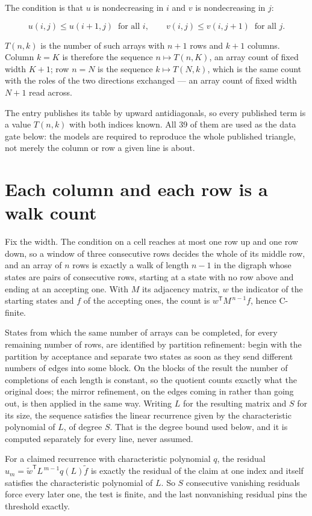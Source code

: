 \documentclass[11pt]{article}
\theoremstyle{definition}
\begin{document}
The condition is that $u$ is nondecreasing in $i$ and $v$ is nondecreasing in $j$:

\[u(i,j) \le u(i{+}1,j) \ \text{ for all } i, \qquad v(i,j) \le v(i,j{+}1) \ \text{ for all } j.\]

$T(n,k)$ is the number of such arrays with $n + 1$ rows and $k + 1$ columns. Column $k = K$ is therefore the sequence $n \mapsto T(n,K)$, an array count of fixed width $K + 1$; row $n = N$ is the sequence $k \mapsto T(N,k)$, which is the same count with the roles of the two directions exchanged --- an array count of fixed width $N + 1$ read across.

The entry publishes its table by upward antidiagonals, so every published term is a value $T(n,k)$ with both indices known. All 39 of them are used as the data gate below: the models are required to reproduce the whole published triangle, not merely the column or row a given line is about.

\section{Each column and each row is a walk count}

Fix the width. The condition on a cell reaches at most one row up and one row down, so a window of three consecutive rows decides the whole of its middle row, and an array of $n$ rows is exactly a walk of length $n-1$ in the digraph whose states are pairs of consecutive rows, starting at a state with no row above and ending at an accepting one. With $M$ its adjacency matrix, $w$ the indicator of the starting states and $f$ of the accepting ones, the count is $w^{\mathsf T}M^{\,n-1}f$, hence C-finite.

States from which the same number of arrays can be completed, for every remaining number of rows, are identified by partition refinement: begin with the partition by acceptance and separate two states as soon as they send different numbers of edges into some block. On the blocks of the result the number of completions of each length is constant, so the quotient counts exactly what the original does; the mirror refinement, on the edges coming in rather than going out, is then applied in the same way. Writing $L$ for the resulting matrix and $S$ for its size, the sequence satisfies the linear recurrence given by the characteristic polynomial of $L$, of degree $S$. That is the degree bound used below, and it is computed separately for every line, never assumed.

For a claimed recurrence with characteristic polynomial $q$, the residual $u_m = \tilde w^{\mathsf T}L^{\,m-1}q(L)\tilde f$ is exactly the residual of the claim at one index and itself satisfies the characteristic polynomial of $L$. So $S$ consecutive vanishing residuals force every later one, the test is finite, and the last nonvanishing residual pins the threshold exactly.
\end{document}
